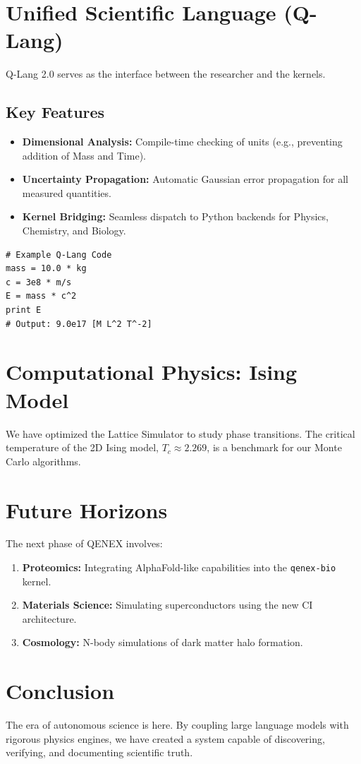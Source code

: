 \documentclass[10pt, twocolumn, a4paper]{article}
\begin{document}
\section{Unified Scientific Language (Q-Lang)}
Q-Lang 2.0 serves as the interface between the researcher and the kernels.

\subsection{Key Features}
\begin{itemize}
    \item \textbf{Dimensional Analysis:} Compile-time checking of units (e.g., preventing addition of Mass and Time).
    \item \textbf{Uncertainty Propagation:} Automatic Gaussian error propagation for all measured quantities.
    \item \textbf{Kernel Bridging:} Seamless dispatch to Python backends for Physics, Chemistry, and Biology.
\end{itemize}

\begin{verbatim}
# Example Q-Lang Code
mass = 10.0 * kg
c = 3e8 * m/s
E = mass * c^2
print E
# Output: 9.0e17 [M L^2 T^-2]
\end{verbatim}

\section{Computational Physics: Ising Model}
We have optimized the Lattice Simulator to study phase transitions. 
The critical temperature of the 2D Ising model, $T_c \approx 2.269$, is a benchmark for our Monte Carlo algorithms.

\section{Future Horizons}
The next phase of QENEX involves:
\begin{enumerate}
    \item \textbf{Proteomics:} Integrating AlphaFold-like capabilities into the \texttt{qenex-bio} kernel.
    \item \textbf{Materials Science:} Simulating superconductors using the new CI architecture.
    \item \textbf{Cosmology:} N-body simulations of dark matter halo formation.
\end{enumerate}

\section{Conclusion}
The era of autonomous science is here. By coupling large language models with rigorous physics engines, we have created a system capable of discovering, verifying, and documenting scientific truth.
\end{document}
